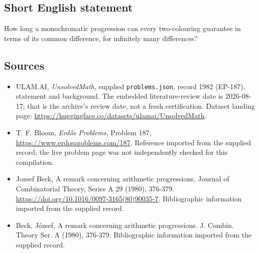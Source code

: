 \documentclass[11pt,a4paper]{article}
\begin{document}
\subsection{Short English statement}

How long a monochromatic progression can every two-colouring guarantee in terms of its common difference, for infinitely many differences?

\subsection{Sources}

{\small

\begin{itemize}

\item[\hypertarget{source:1982:1}{S1}] ULAM.AI, \emph{UnsolvedMath}, supplied \texttt{problems.json}, record 1982 (EP-187), statement and background. The embedded literature-review date is 2026-08-17; that is the archive’s review date, not a fresh certification. Dataset landing page: \url{https://huggingface.co/datasets/ulamai/UnsolvedMath}.

\item[\hypertarget{source:1982:2}{S2}] T. F. Bloom, \emph{Erdős Problems}, Problem 187, \url{https://www.erdosproblems.com/187}. Reference imported from the supplied record; the live problem page was not independently checked for this compilation.

\item[\hypertarget{source:1982:3}{S3}] Jozsef Beck, A remark concerning arithmetic progressions, Journal of Combinatorial Theory, Series A 29 (1980), 376-379. \url{https://doi.org/10.1016/0097-3165(80)90035-7}. Bibliographic information imported from the supplied record.

\item[\hypertarget{source:1982:4}{S4}] Beck, J\'{o}zsef, A remark concerning arithmetic progressions. J. Combin. Theory Ser. A (1980), 376-379. Bibliographic information imported from the supplied record.

\end{itemize}

}

\label{end:1982}
\end{document}
